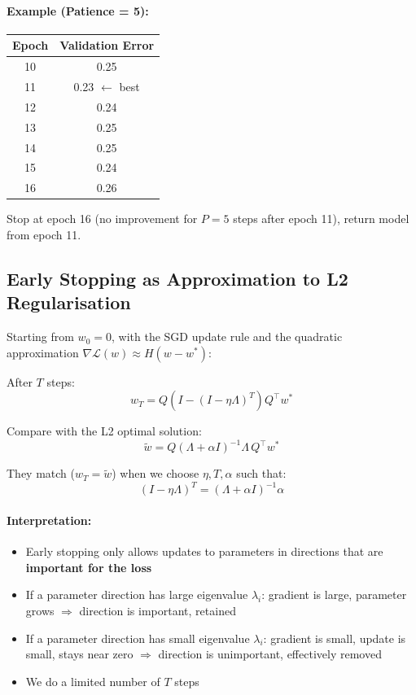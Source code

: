 \documentclass[12pt,a4paper]{article}
\newcommand{\grad}{\nabla}
\newcommand{\Loss}{\mathcal{L}}
\begin{document}
\paragraph{Example (Patience = 5):}
\begin{center}
\begin{tabular}{cc}
\toprule
Epoch & Validation Error\\
\midrule
10 & 0.25\\
11 & 0.23 $\leftarrow$ best \\
12 & 0.24\\
13 & 0.25\\
14 & 0.25\\
15 & 0.24\\
16 & 0.26\\
\bottomrule
\end{tabular}
\end{center}

Stop at epoch 16 (no improvement for $P=5$ steps after epoch 11), return model from epoch 11.

\subsection{Early Stopping as Approximation to L2 Regularisation}

\begin{theorembox}[title={Early Stopping $\approx$ L2 Regularisation}]
Starting from $w_0 = 0$, with the SGD update rule and the quadratic approximation $\grad\Loss(w) \approx H(w-w^*)$:

After $T$ steps:
\[
  w_T = Q(I - (I-\eta\Lambda)^T)Q^\top w^*
\]

Compare with the L2 optimal solution:
\[
  \tilde{w} = Q(\Lambda+\alpha I)^{-1}\Lambda\, Q^\top w^*
\]

They match ($w_T = \tilde{w}$) when we choose $\eta, T, \alpha$ such that:
\[
  (I - \eta\Lambda)^T = (\Lambda + \alpha I)^{-1}\alpha
\]
\end{theorembox}

\paragraph{Interpretation:}
\begin{itemize}
  \item Early stopping only allows updates to parameters in directions that are \textbf{important for the loss}
  \item If a parameter direction has large eigenvalue $\lambda_i$: gradient is large, parameter grows $\Rightarrow$ direction is important, retained
  \item If a parameter direction has small eigenvalue $\lambda_i$: gradient is small, update is small, stays near zero $\Rightarrow$ direction is unimportant, effectively removed
  \item We do a limited number of $T$ steps
\end{itemize}
\end{document}
